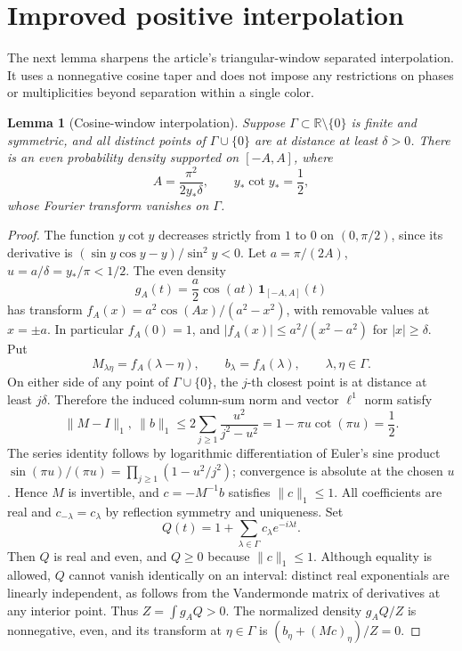 \documentclass[11pt]{article}
\newtheorem{lemma}[theorem]{Lemma}
\theoremstyle{remark}\newtheorem{remark}[theorem]{Remark}
\newcommand{\R}{\mathbb R}\newcommand{\C}{\mathbb C}\newcommand{\D}{\mathbb D}
\begin{document}
\section{Improved positive interpolation}
The next lemma sharpens the article's triangular-window separated interpolation. It uses a nonnegative cosine taper and does not impose any restrictions on phases or multiplicities beyond separation within a single color.
\begin{lemma}[Cosine-window interpolation]\label{lem:cosine}
Suppose $\Gamma\subset\R\setminus\{0\}$ is finite and symmetric, and all distinct points of $\Gamma\cup\{0\}$ are at distance at least $\delta>0$. There is an even probability density supported on $[-A,A]$, where
\[
 A=\frac{\pi^2}{2y_*\delta},\qquad y_*\cot y_*=\frac12,
\]
whose Fourier transform vanishes on $\Gamma$.
\end{lemma}
\begin{proof}
The function $y\cot y$ decreases strictly from $1$ to $0$ on $(0,\pi/2)$, since its derivative is $(\sin y\cos y-y)/\sin^2y<0$. Let $a=\pi/(2A)$, $u=a/\delta=y_*/\pi<1/2$. The even density
\[
 g_A(t)=\frac a2\cos(at)\,\mathbf 1_{[-A,A]}(t)
\]
has transform $f_A(x)=a^2\cos(Ax)/(a^2-x^2)$, with removable values at $x=\pm a$. In particular $f_A(0)=1$, and $|f_A(x)|\le a^2/(x^2-a^2)$ for $|x|\ge\delta$. Put
\[
 M_{\lambda\eta}=f_A(\lambda-\eta),\qquad b_\lambda=f_A(\lambda),\qquad \lambda,\eta\in\Gamma.
\]
On either side of any point of $\Gamma\cup\{0\}$, the $j$-th closest point is at distance at least $j\delta$. Therefore the induced column-sum norm and vector $\ell^1$ norm satisfy
\[
 \|M-I\|_1,\ \|b\|_1\le2\sum_{j\ge1}\frac{u^2}{j^2-u^2}
   =1-\pi u\cot(\pi u)=\frac12.
\]
The series identity follows by logarithmic differentiation of Euler's sine product $\sin(\pi u)/(\pi u)=\prod_{j\ge1}(1-u^2/j^2)$; convergence is absolute at the chosen $u$. Hence $M$ is invertible, and $c=-M^{-1}b$ satisfies $\|c\|_1\le1$. All coefficients are real and $c_{-\lambda}=c_\lambda$ by reflection symmetry and uniqueness. Set
\[
 Q(t)=1+\sum_{\lambda\in\Gamma}c_\lambda e^{-i\lambda t}.
\]
Then $Q$ is real and even, and $Q\ge0$ because $\|c\|_1\le1$. Although equality is allowed, $Q$ cannot vanish identically on an interval: distinct real exponentials are linearly independent, as follows from the Vandermonde matrix of derivatives at any interior point. Thus $Z=\int g_AQ>0$. The normalized density $g_AQ/Z$ is nonnegative, even, and its transform at $\eta\in\Gamma$ is $(b_\eta+(Mc)_\eta)/Z=0$.
\end{proof}
\end{document}
